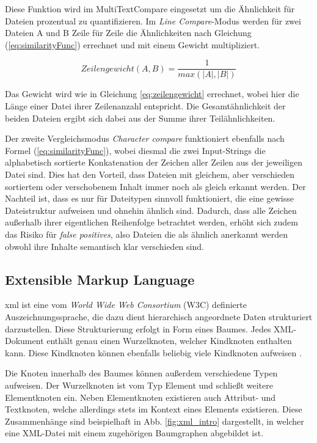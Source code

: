 Diese Funktion wird im MultiTextCompare eingesetzt um die Ähnlichkeit für Dateien prozentual zu quantifizieren. Im \textit{Line Compare}-Modus werden für zwei Dateien A und B Zeile für Zeile die Ähnlichkeiten nach Gleichung (\ref{eq:similarityFunc}) errechnet und mit einem Gewicht multipliziert.

\begin{equation}
    Zeilengewicht(A,B) = \frac{1}{max(|A|,|B|)}
    \label{eq:zeilengewicht}
\end{equation}

Das Gewicht wird wie in Gleichung \ref{eq:zeilengewicht} errechnet, wobei hier die Länge einer Datei ihrer Zeilenanzahl entspricht. Die Gesamtähnlichkeit der beiden Dateien ergibt sich dabei aus der Summe ihrer Teilähnlichkeiten.

Der zweite Vergleichsmodus \textit{Character compare} funktioniert ebenfalls nach Formel (\ref{eq:similarityFunc}), wobei diesmal die zwei Input-Strings die alphabetisch sortierte Konkatenation der Zeichen aller Zeilen aus der jeweiligen Datei sind. Dies hat den Vorteil, dass Dateien mit gleichem, aber verschieden sortiertem oder verschobenem Inhalt immer noch als gleich erkannt werden. Der Nachteil ist, dass es nur für Dateitypen sinnvoll funktioniert, die eine gewisse Dateistruktur aufweisen und ohnehin ähnlich sind. Dadurch, dass alle Zeichen außerhalb ihrer eigentlichen Reihenfolge betrachtet werden, erhöht sich zudem das Risiko für \textit{false positives}, also Dateien die als ähnlich anerkannt werden obwohl ihre Inhalte semantisch klar verschieden sind.

\subsection{Extensible Markup Language}

\acrfull{xml} ist eine vom \textit{World Wide Web Consortium} (W3C) definierte Auszeichnungssprache, die dazu dient hierarchisch angeordnete Daten strukturiert darzustellen. Diese Strukturierung erfolgt in Form eines Baumes. Jedes XML-Dokument enthält genau einen Wurzelknoten, welcher Kindknoten enthalten kann. Diese Kindknoten können ebenfalls beliebig viele Kindknoten aufweisen \autocite[Abs. 2]{xmlSpec}. 

Die Knoten innerhalb des Baumes können außerdem verschiedene Typen aufweisen. Der Wurzelknoten ist vom Typ Element und schließt weitere Elementknoten ein. Neben Elementknoten existieren auch Attribut- und Textknoten, welche  allerdings stets im Kontext eines Elements existieren. Diese Zusammenhänge sind beispielhaft in Abb. \ref{fig:xml_intro} dargestellt, in welcher eine XML-Datei mit einem zugehörigen Baumgraphen abgebildet ist.

